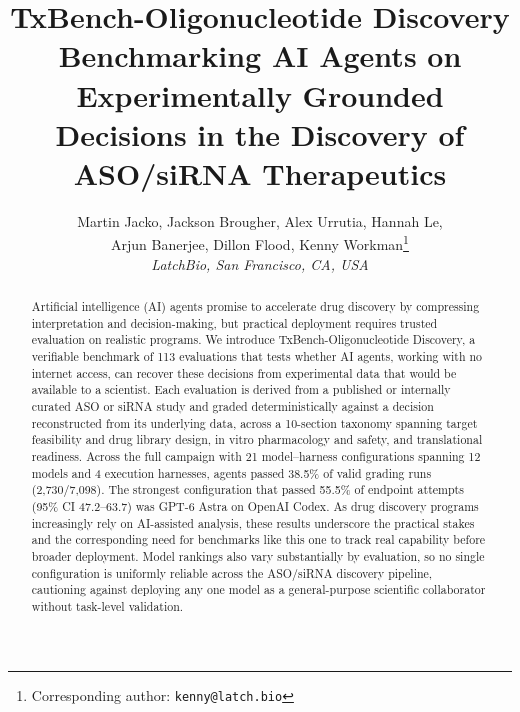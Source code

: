 \documentclass[11pt]{article}
\title{\textbf{TxBench-Oligonucleotide Discovery}\\[4pt]
\large Benchmarking AI Agents on Experimentally Grounded Decisions in the Discovery of ASO/siRNA Therapeutics}
\author{Martin Jacko, Jackson Brougher, Alex Urrutia, Hannah Le, \\
Arjun Banerjee, Dillon Flood, Kenny Workman\thanks{Corresponding author: \texttt{kenny@latch.bio}} \\[6pt]
\normalsize\itshape LatchBio, San Francisco, CA, USA}
\date{}
\begin{document}
\maketitle
\begin{abstract}
\noindent Artificial intelligence (AI) agents promise to accelerate drug discovery by compressing interpretation and decision-making, but practical deployment requires trusted evaluation on realistic programs. We introduce TxBench-Oligonucleotide Discovery, a verifiable benchmark of 113 evaluations  that tests whether AI agents, working with no internet access, can recover these decisions from  experimental data that would be available to a scientist. Each evaluation is derived from a published or internally curated ASO or siRNA study and graded deterministically against a decision reconstructed from its underlying data, across a 10-section taxonomy spanning target feasibility and drug library design, in vitro pharmacology and safety, and translational readiness. Across the full campaign with 21 model--harness configurations spanning 12 models and 4 execution harnesses, agents passed 38.5\% of valid grading runs (2,730/7,098). The strongest configuration that passed 55.5\% of endpoint attempts (95\% CI 47.2--63.7) was GPT-6 Astra on OpenAI Codex. As drug discovery programs increasingly rely on AI-assisted analysis, these results underscore the practical stakes and the corresponding need for benchmarks like this one to track real capability before broader deployment. Model rankings also vary substantially by evaluation, so no single configuration is uniformly reliable across the ASO/siRNA discovery pipeline, cautioning against deploying any one model as a general-purpose scientific collaborator without task-level validation.
\end{abstract}
\end{document}
